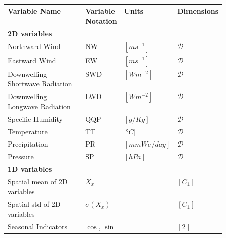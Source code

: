 \begin{table}[tbp]
    \centering
    \caption{}
    \renewcommand\arraystretch{1.5}
    \begin{tabular}{l>{\centering}p{0.1\linewidth}>{\centering}p{0.2\linewidth}>{\centering\arraybackslash}p{0.2\linewidth}}
    \toprule
        \textbf{Variable Name} & \textbf{Variable Notation} & \textbf{Units} & \textbf{Dimensions} \\ \toprule
        \textbf{2D variables} & & & \\ \bottomrule 
        Northward Wind & NW & $\si{[ms^{-1}]}$ & $\mathcal{D}$   \\ 
        Eastward Wind & EW & $\si{[ms^{-1}]}$ & $ \mathcal{D}$ \\
        Downwelling Shortwave Radiation & SWD & $\si{[Wm^{-2}]}$ & $ \mathcal{D}$ \\
        Downwelling Longwave Radiation & LWD & $\si{[Wm^{-2}]}$ & $\mathcal{D}$ \\
        Specific Humidity & QQP & $\si{[g/Kg]}$ & $\mathcal{D}$ \\
        Temperature & TT & $\si{[\degree C]}$ & $\mathcal{D}$ \\
        Precipitation & PR & $\si{[mmWe/day]}$ & $\mathcal{D}$  \\
        Pressure & SP & $\si{[hPa]}$ & $ \mathcal{D}$  \\
        \toprule
         \textbf{1D variables} & & & \\ \bottomrule
        Spatial mean of 2D variables & $\bar{X}_{x}$ & & $[C_1]$ \\ 
        Spatial std of 2D variables & $\sigma\left(X_{x}\right)$ & & $[C_1]$ \\
        Seasonal Indicators & $\cos$, $\sin$& & $[2]$\\ \bottomrule
        
    \end{tabular}
            \label{tab:features}
\end{table}